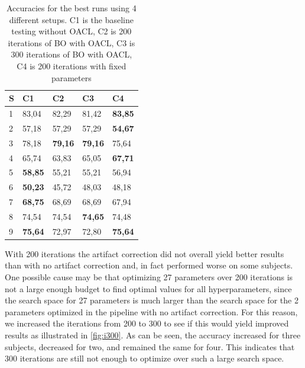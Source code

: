 \begin{table}[H]
	\begin{tabular}{@{}l|llll@{}} \toprule
		S					  & C1             & C2             & C3             & C4             \\ \midrule
		1                     & 83,04          & 82,29          & 81,42          & \textbf{83,85} \\
		2                     & 57,18          & 57,29          & 57,29          & \textbf{54,67} \\
		3                     & 78,18          & \textbf{79,16} & \textbf{79,16} & 75,64          \\
		4                     & 65,74          & 63,83          & 65,05          & \textbf{67,71} \\
		5                     & \textbf{58,85} & 55,21          & 55,21          & 56,94          \\
		6                     & \textbf{50,23} & 45,72          & 48,03          & 48,18          \\
		7                     & \textbf{68,75} & 68,69          & 68,69          & 67,94          \\
		8                     & 74,54          & 74,54          & \textbf{74,65} & 74,48          \\
		9                     & \textbf{75,64} & 72,97          & 72,80          & \textbf{75,64} \\ \bottomrule
	\end{tabular}
	\centering
	\caption{Accuracies for the best runs using 4 different setups. C1 is the baseline testing without OACL, C2 is 200 iterations of BO with OACL, C3 is 300 iterations of BO with OACL, C4 is 200 iterations with fixed parameters}
	\label{my-label}
\end{table}

With 200 iterations the artifact correction did not overall yield better results than with no artifact correction and, in fact performed worse on some subjects. One possible cause may be that optimizing 27 parameters over 200 iterations is not a large enough budget to find optimal values for all hyperparameters, since the search space for 27 parameters is much larger than the search space for the 2 parameters optimized in the pipeline with no artifact correction. For this reason, we increased the iterations from 200 to 300 to see if this would yield improved results as illustrated in \cref{fig:i300}. As can be seen, the accuracy increased for three subjects, decreased for two, and remained the same for four. This indicates that 300 iterations are still not enough to optimize over such a large search space. 

